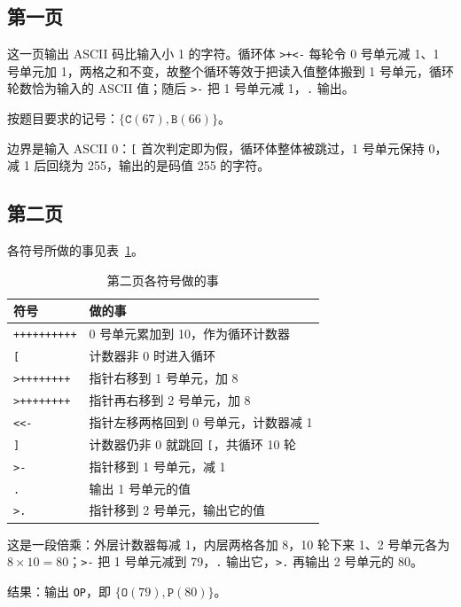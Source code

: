\documentclass[a4paper, 12pt, linespread=1.35]{ctexart}   %
\begin{document}
\subsection{第一页}

这一页输出 ASCII 码比输入小 1 的字符。循环体 \texttt{>+<-} 每轮令 0 号单元减 1、1 号单元加 1，两格之和不变，故整个循环等效于把读入值整体搬到 1 号单元，循环轮数恰为输入的 ASCII 值；随后 \texttt{>-} 把 1 号单元减 1，\texttt{.} 输出。

按题目要求的记号：$\{\texttt{C}(67), \texttt{B}(66)\}$。

边界是输入 ASCII 0：\texttt{[} 首次判定即为假，循环体整体被跳过，1 号单元保持 0，减 1 后回绕为 255，输出的是码值 255 的字符。

\subsection{第二页}

各符号所做的事见表~\ref{tab:page2}。

\begin{table}[H]
  \centering
  \small
  \caption{第二页各符号做的事}
  \label{tab:page2}
  \begin{tabular}{@{}ll@{}}
    \toprule
    符号 & 做的事 \\
    \midrule
    \texttt{++++++++++} & 0 号单元累加到 10，作为循环计数器 \\
    \texttt{[} & 计数器非 0 时进入循环 \\
    \texttt{>++++++++} & 指针右移到 1 号单元，加 8 \\
    \texttt{>++++++++} & 指针再右移到 2 号单元，加 8 \\
    \texttt{<<-} & 指针左移两格回到 0 号单元，计数器减 1 \\
    \texttt{]} & 计数器仍非 0 就跳回 \texttt{[}，共循环 10 轮 \\
    \texttt{>-} & 指针移到 1 号单元，减 1 \\
    \texttt{.} & 输出 1 号单元的值 \\
    \texttt{>.} & 指针移到 2 号单元，输出它的值 \\
    \bottomrule
  \end{tabular}
\end{table}

这是一段倍乘：外层计数器每减 1，内层两格各加 8，10 轮下来 1、2 号单元各为 $8\times10=80$；\texttt{>-} 把 1 号单元减到 79，\texttt{.} 输出它，\texttt{>.} 再输出 2 号单元的 80。

结果：输出 \texttt{OP}，即 $\{\texttt{O}(79), \texttt{P}(80)\}$。
\end{document}
